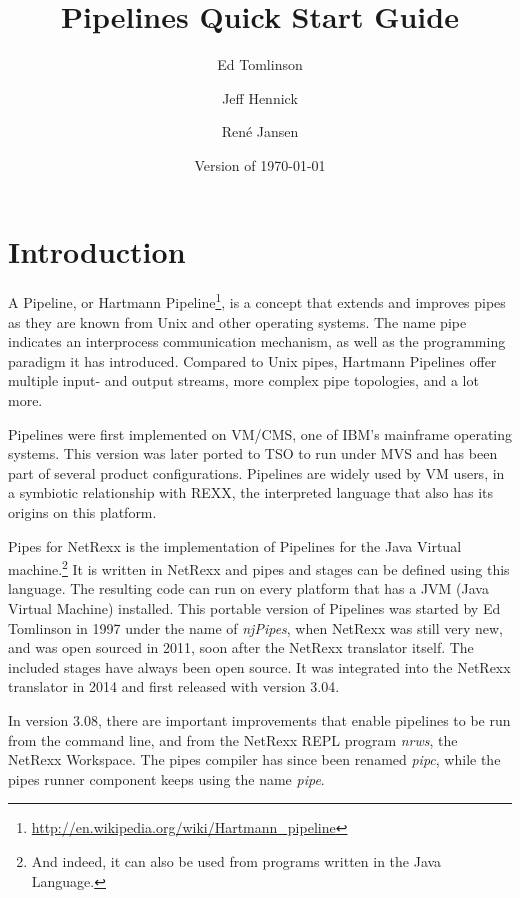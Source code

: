 

\renewcommand{\isbn}{978-90-819090-3-7}    
\setcounter{tocdepth}{1} 
\title{Pipelines Quick Start Guide}
\author{Ed Tomlinson \and Jeff Hennick \and René Jansen}
\date{Version  of \today}
\maketitle
{}
\pagestyle{plain}
\frontmatter
{}
\pagestyle{plain}

\tableofcontents
\newpage
{}
\frontmatter
\large


\mainmatter
\chapter{Introduction}
A Pipeline, or Hartmann Pipeline\footnote{\url{http://en.wikipedia.org/wiki/Hartmann_pipeline}}, is a concept that extends and improves pipes as they are known from Unix and other operating systems. The name pipe indicates an interprocess communication mechanism, as well as the programming paradigm it has introduced. Compared to Unix pipes, Hartmann Pipelines offer multiple input- and output streams, more complex pipe topologies, and a lot more.

Pipelines were first implemented on VM/CMS, one of IBM's mainframe
operating systems. This version was later ported to TSO to run under
MVS and has been part of several product configurations. Pipelines are
widely used by VM users, in a symbiotic relationship with REXX, the
interpreted language that also has its origins on this platform.

Pipes for NetRexx is the implementation of Pipelines for the Java Virtual
machine.\footnote{And indeed, it can also be used from programs written
  in the Java Language.} It is written in NetRexx and pipes and stages can be defined using this
language. The resulting code can run on every platform that has a JVM
(Java Virtual Machine) installed. This portable version of Pipelines was started
by Ed Tomlinson in 1997 under the name of \emph{njPipes}, when NetRexx was
still very new, and was open sourced in 2011, soon after the NetRexx
translator itself. The included stages have always been open source. It was integrated into the NetRexx translator in
2014 and first released with version 3.04.

In version 3.08, there are
important improvements that enable pipelines to be run from the
command line, and from the NetRexx REPL program \emph{nrws}, the
NetRexx Workspace. The pipes compiler has since been renamed
\emph{pipc}, while the pipes runner component keeps using the name \emph{pipe}.


